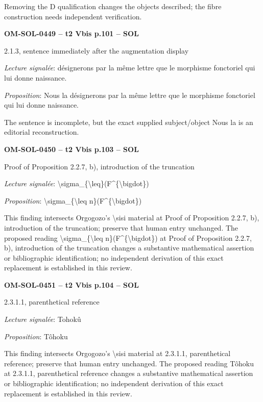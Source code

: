 Removing the D qualification changes the objects described; the fibre construction needs independent verification.\par
\par\noindent\textbf{OM-SOL-0449 -- t2 Vbis p.101 -- SOL}\par
2.1.3, sentence immediately after the augmentation display\par
\emph{Lecture signalée}: désignerons par la même lettre que le morphisme fonctoriel qui lui donne naissance.\par
\emph{Proposition}: Nous la désignerons par la même lettre que le morphisme fonctoriel qui lui donne naissance.\par
The sentence is incomplete, but the exact supplied subject/object Nous la is an editorial reconstruction.\par
\par\noindent\textbf{OM-SOL-0450 -- t2 Vbis p.103 -- SOL}\par
Proof of Proposition 2.2.7, b), introduction of the truncation\par
\emph{Lecture signalée}: \textbackslash{}sigma\_\{\textbackslash{}leq\}(F\textasciicircum{}\{\textbackslash{}bigdot\})\par
\emph{Proposition}: \textbackslash{}sigma\_\{\textbackslash{}leq n\}(F\textasciicircum{}\{\textbackslash{}bigdot\})\par
This finding intersects Orgogozo's \textbackslash{}sisi material at Proof of Proposition 2.2.7, b), introduction of the truncation; preserve that human entry unchanged. The proposed reading \textbackslash{}sigma\_\{\textbackslash{}leq n\}(F\textasciicircum{}\{\textbackslash{}bigdot\}) at Proof of Proposition 2.2.7, b), introduction of the truncation changes a substantive mathematical assertion or bibliographic identification; no independent derivation of this exact replacement is established in this review.\par
\par\noindent\textbf{OM-SOL-0451 -- t2 Vbis p.104 -- SOL}\par
2.3.1.1, parenthetical reference\par
\emph{Lecture signalée}: Tohokû\par
\emph{Proposition}: Tôhoku\par
This finding intersects Orgogozo's \textbackslash{}sisi material at 2.3.1.1, parenthetical reference; preserve that human entry unchanged. The proposed reading Tôhoku at 2.3.1.1, parenthetical reference changes a substantive mathematical assertion or bibliographic identification; no independent derivation of this exact replacement is established in this review.\par
